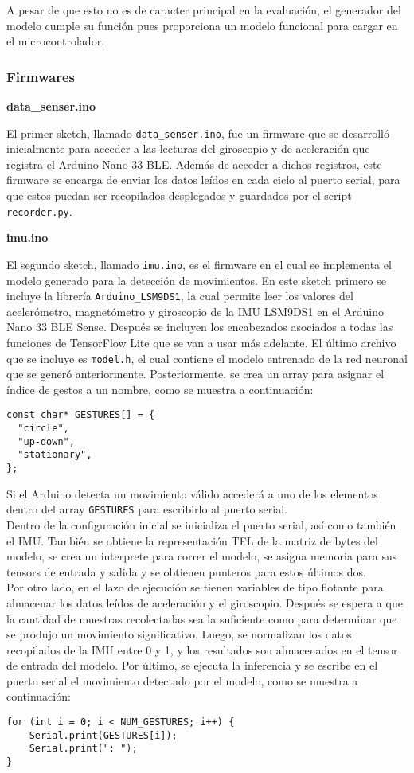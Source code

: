 A pesar de que esto no es de caracter principal en la evaluación, el generador del modelo cumple su función pues proporciona un modelo funcional para cargar en el microcontrolador.






\subsubsection{Firmwares}

\textbf{data\_senser.ino}

El primer sketch, llamado \texttt{data\_senser.ino}, fue un firmware que se desarrolló inicialmente para acceder a las lecturas del giroscopio y de aceleración que registra el Arduino Nano 33 BLE. Además de acceder a dichos registros, este firmware se encarga de enviar los datos leídos en cada ciclo al puerto serial, para que estos puedan ser recopilados desplegados y guardados por el script \texttt{recorder.py}.

\textbf{imu.ino}

El segundo sketch, llamado \texttt{imu.ino}, es el firmware en el cual se implementa el modelo generado para la detección de movimientos. En este sketch primero se incluye la librería \texttt{Arduino\_LSM9DS1}, la cual permite leer los valores del acelerómetro, magnetómetro y giroscopio de la IMU LSM9DS1 en el Arduino Nano 33 BLE Sense. Después se incluyen los encabezados asociados a todas las funciones de TensorFlow Lite que se van a usar más adelante. El último archivo que se incluye es \texttt{model.h}, el cual contiene el modelo entrenado de la red neuronal que se generó anteriormente. Posteriormente, se crea un array para asignar el índice de gestos a un nombre, como se muestra a continuación:

\begin{verbatim}
const char* GESTURES[] = {
  "circle",
  "up-down",
  "stationary",
};
\end{verbatim}

Si el Arduino detecta un movimiento válido accederá a uno de los elementos dentro del array \texttt{GESTURES} para escribirlo al puerto serial.\\
Dentro de la configuración inicial se inicializa el puerto serial, así como también el IMU. También se obtiene la representación TFL de la matriz de bytes del modelo, se crea un interprete para correr el modelo, se asigna memoria para sus tensors de entrada y salida y se obtienen punteros para estos últimos dos.\\
Por otro lado, en el lazo de ejecución se tienen variables de tipo flotante para almacenar los datos leídos de aceleración y el giroscopio. Después se espera a que la cantidad de muestras recolectadas sea la suficiente como para determinar que se produjo un movimiento significativo. Luego, se normalizan los datos recopilados de la IMU entre 0 y 1, y los resultados son almacenados en el tensor de entrada del modelo. Por último, se ejecuta la inferencia y se escribe en el puerto serial el movimiento detectado por el modelo, como se muestra a continuación:

\begin{verbatim}
for (int i = 0; i < NUM_GESTURES; i++) {
    Serial.print(GESTURES[i]);
    Serial.print(": ");
}
\end{verbatim}


